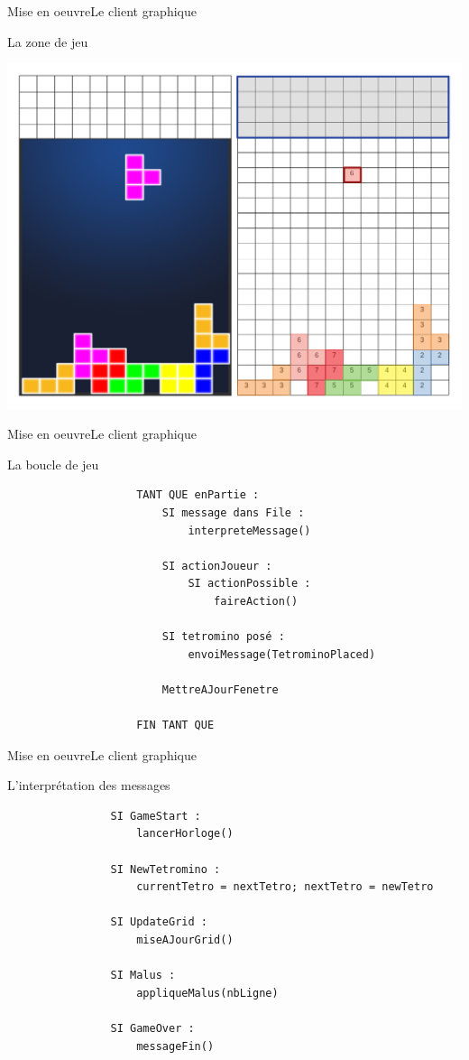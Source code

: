 \documentclass[french]{beamer}
\begin{document}
		\begin{frame}{Mise en oeuvre}{Le client graphique}
			\begin{block}{La zone de jeu}
				\begin{center}
					\includegraphics[scale=0.2]{img/grid.png}
				\end{center}
			\end{block}
		\end{frame}


		\begin{frame}[fragile]{Mise en oeuvre}{Le client graphique}
			\begin{block}{La boucle de jeu}				
				\begin{verbatim}
					TANT QUE enPartie :
					    SI message dans File :
					        interpreteMessage()

					    SI actionJoueur :
					        SI actionPossible :
					            faireAction()

					    SI tetromino posé : 
					        envoiMessage(TetrominoPlaced)

					    MettreAJourFenetre

					FIN TANT QUE
				\end{verbatim}

			\end{block}
		\end{frame}

		\begin{frame}[fragile]{Mise en oeuvre}{Le client graphique}
			\begin{block}{L'interprétation des messages}				
			\begin{verbatim}
				SI GameStart : 
				    lancerHorloge()

				SI NewTetromino :
				    currentTetro = nextTetro; nextTetro = newTetro

				SI UpdateGrid :
				    miseAJourGrid()

				SI Malus :
				    appliqueMalus(nbLigne)

				SI GameOver : 
				    messageFin()
				\end{verbatim}

			\end{block}
		\end{frame}
\end{document}
